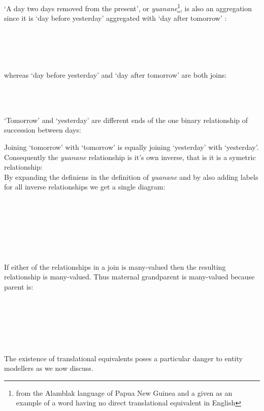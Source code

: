 \noindent `A day two days removed from the present', or \textit{yuanane}\footnote{from the Alamblak language of Papua New Guinea and a given as an example of a word having no direct translational equivalent in English}, is also an aggregation since it is `day before yesterday' aggregated with `day after tomorrow' :\\
\begin{equation}
\raisebox{-1.725cm}{

}
\end{equation}

\noindent whereas `day before yesterday' and `day after tomorrow' are both joins:\\
\begin{equation}
\raisebox{-1.15cm}{

}
\end{equation}

\noindent `Tomorrow' and `yesterday' are different ends of the one binary relationship of succession between days:

\begin{center}

\end{center}

\noindent Joining `tomorrow' with `tomorrow' is equally 
joining `yesterday' with `yesterday'. Consequently the \textit{yuanane} relationship 
is it's own inverse, that is it is a symetric relationship: \\

\noindent By expanding the definiens in the definition of \textit{yuanane} and by also adding labels for all inverse relationships we get a single diagram:
\begin{equation}
\raisebox{-2.875cm}{

}
\end{equation}

\noindent If either of the relationships in a join is many-valued then the resulting relationship is many-valued. Thus maternal grandparent is many-valued because parent is:

\begin{equation}
\raisebox{-2.3cm}{

}
\end{equation}

\noindent The existence of translational equivalents poses a particular danger to entity modellers as we now discuss.\\

